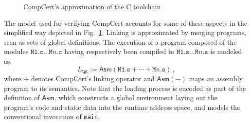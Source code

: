 \documentclass[sigplan,10pt,review,anonymous]{acmart}\settopmatter{printfolios=true,printccs=false,printacmref=false}
\newcommand{\kw}[1]{\ensuremath{ \mathsf{#1} }}
\begin{document}
\begin{figure} %
    \caption{CompCert's approximation of the C toolchain}
    \label{fig:process}
\end{figure}

The model used for verifying CompCert accounts for
some of these aspects in the simplified way
depicted in Fig.~\ref{fig:process}.
Linking is approximated by
merging programs, seen as sets of global definitions.
The execution
of a program composed of the modules
$\texttt{M1.c} \ldots \texttt{M$n$.c}$
having respectively been compiled to
$\texttt{M1.s} \ldots \texttt{M$n$.s}$
is modeled as:
\[
    L_\kw{tgt} :=
    \kw{Asm}(\texttt{M1.s} +
             \cdots +
             \texttt{M$n$.s}) \,,
\]
where
$+$ denotes CompCert's linking operator and
$\kw{Asm}(-)$ maps an assembly program to its semantics.
Note that the loading process is encoded
as part of the definition of $\kw{Asm}$,
which constructs a global environment
laying out the program's code and static data
into the runtime address space,
and models the conventional invocation of \texttt{main}.
\end{document}
